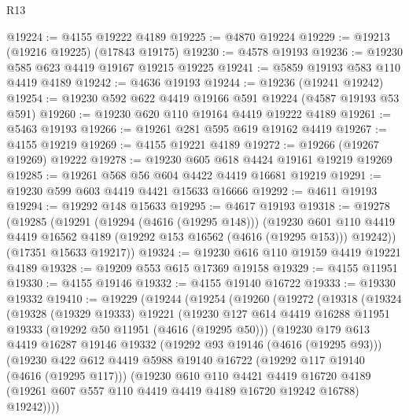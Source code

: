 \begin{lexlean}{R13}
\begin{coremodule}
@19224 := @4155 @19222 @4189
@19225 := @4870 @19224
@19229 := @19213 (@19216 @19225) (@17843 @19175)
@19230 := @4578 @19193
@19236 := @19230 @585 @623 @4419 @19167 @19215 @19225
@19241 := @5859 @19193 @583 @110 @4419 @4189
@19242 := @4636 @19193
@19244 := @19236 (@19241 @19242)
@19254 := @19230 @592 @622 @4419 @19166 @591 @19224 (@4587 @19193 @53 @591)
@19260 := @19230 @620 @110 @19164 @4419 @19222 @4189
@19261 := @5463 @19193
@19266 := @19261 @281 @595 @619 @19162 @4419
@19267 := @4155 @19219
@19269 := @4155 @19221 @4189
@19272 := @19266 (@19267 @19269) @19222
@19278 := @19230 @605 @618 @4424 @19161 @19219 @19269
@19285 := @19261 @568 @56 @604 @4422 @4419 @16681 @19219
@19291 := @19230 @599 @603 @4419 @4421 @15633 @16666
@19292 := @4611 @19193
@19294 := @19292 @148 @15633
@19295 := @4617 @19193
@19318 := @19278
    (@19285
      (@19291
        (@19294 (@4616 (@19295 @148)))
        (@19230
          @601
          @110
          @4419
          @4419
          @16562
          @4189
          (@19292 @153 @16562 (@4616 (@19295 @153)))
          @19242))
      (@17351 @15633 @19217))
@19324 := @19230 @616 @110 @19159 @4419 @19221 @4189
@19328 := @19209 @553 @615 @17369 @19158
@19329 := @4155 @11951
@19330 := @4155 @19146
@19332 := @4155 @19140 @16722
@19333 := @19330 @19332
@19410 := @19229
    (@19244
      (@19254
        (@19260
          (@19272
            (@19318
              (@19324
                (@19328
                  (@19329 @19333)
                  @19221
                  (@19230
                    @127
                    @614
                    @4419
                    @16288
                    @11951
                    @19333
                    (@19292 @50 @11951 (@4616 (@19295 @50)))
                    (@19230
                      @179
                      @613
                      @4419
                      @16287
                      @19146
                      @19332
                      (@19292 @93 @19146 (@4616 (@19295 @93)))
                      (@19230
                        @422
                        @612
                        @4419
                        @5988
                        @19140
                        @16722
                        (@19292 @117 @19140 (@4616 (@19295 @117)))
                        (@19230
                          @610
                          @110
                          @4421
                          @4419
                          @16720
                          @4189
                          (@19261 @607 @557 @110 @4419 @4419 @4189 @16720 @19242 @16788)
                          @19242))))

\end{coremodule}
\end{lexlean}

